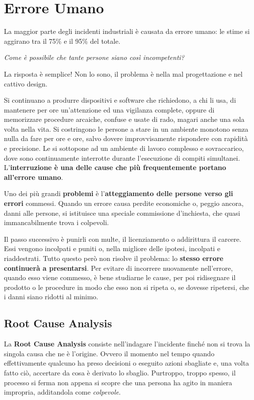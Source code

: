 \chapter{Errore Umano}

La maggior parte degli incidenti industriali è causata da errore umano:
le stime si aggirano tra il 75\% e il 95\% del totale.

\begin{flushleft}
	\textit{Come è possibile che tante persone siano così incompetenti?}
\end{flushleft}

La risposta è semplice! Non lo sono, il problema è nella mal progettazione e nel cattivo design.

Si continuano a produrre dispositivi e software che richiedono, a chi li usa, di mantenere per ore un'attenzione ed una vigilanza complete, oppure di memorizzare procedure arcaiche, confuse e usate di rado, magari anche una sola volta nella vita. Si costringono le persone a stare in un ambiente monotono senza nulla da fare per ore e ore, salvo dovere improvvisamente rispondere con rapidità e precisione. Le si sottopone ad un ambiente di lavoro complesso e sovraccarico, dove sono continuamente interrotte durante l'esecuzione di compiti simultanei. L'\textbf{interruzione è una delle cause che più frequentemente portano all'errore umano}.

Uno dei più grandi \textbf{problemi} è l'\textbf{atteggiamento delle persone verso gli errori} commessi. Quando un errore causa perdite economiche o, peggio ancora, danni alle persone, si istituisce una speciale commissione d'inchiesta, che quasi immancabilmente trova i colpevoli.

Il passo successivo è punirli con multe, il licenziamento o addirittura il carcere. Essi vengono incolpati
e puniti o, nella migliore delle ipotesi, incolpati e riaddestrati. Tutto questo però non
risolve il problema: lo \textbf{stesso errore continuerà a presentarsi}.  Per evitare di incorrere nuovamente nell'errore, quando esso viene commesso, è bene  studiarne le cause, per poi ridisegnare il prodotto o le procedure in modo che esso non si ripeta o, se dovesse ripetersi, che i danni siano ridotti al minimo.

\section{Root Cause Analysis}
La \textbf{Root Cause Analysis} consiste nell'indagare l'incidente finché non si trova la singola causa che ne è l'origine. Ovvero il momento nel tempo quando effettivamente qualcuno ha preso decisioni o eseguito azioni sbagliate e,
una volta fatto ciò, accertare da cosa è derivato lo sbaglio. Purtroppo, troppo spesso, il processo si ferma non appena si scopre che una persona ha agito in maniera impropria, additandola come \textit{colpevole}.

